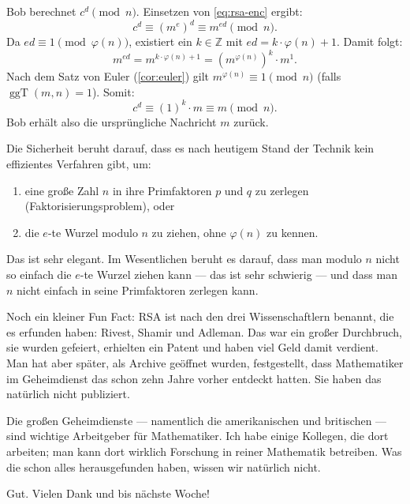\begin{math-stroke}
\begin{short-proof}
Bob berechnet $c^d \pmod n$. Einsetzen von \eqref{eq:rsa-enc} ergibt:
\[
c^d \equiv (m^e)^d \equiv m^{ed} \pmod n.
\]
Da $ed \equiv 1 \pmod{\varphi(n)}$, existiert ein $k \in \mathbb{Z}$ mit $ed = k \cdot \varphi(n) + 1$. Damit folgt:
\[
m^{ed} = m^{k \cdot \varphi(n) + 1} = (m^{\varphi(n)})^k \cdot m^1.
\]
Nach dem Satz von Euler (\cref{cor:euler}) gilt $m^{\varphi(n)} \equiv 1 \pmod n$ (falls $\operatorname{ggT}(m, n) = 1$). Somit:
\[
c^d \equiv (1)^k \cdot m \equiv m \pmod n.
\]
Bob erhält also die ursprüngliche Nachricht $m$ zurück.
\end{short-proof}

\begin{explanation-of-steps}
Die Sicherheit beruht darauf, dass es nach heutigem Stand der Technik kein effizientes Verfahren gibt, um:
\begin{enumerate}
    \item eine große Zahl $n$ in ihre Primfaktoren $p$ und $q$ zu zerlegen (Faktorisierungsproblem), oder
    \item die $e$-te Wurzel modulo $n$ zu ziehen, ohne $\varphi(n)$ zu kennen.
\end{enumerate}
\end{explanation-of-steps}
\end{math-stroke}

\begin{spoken-clean}[01:28:02 - 01:30:21]
Das ist sehr elegant. Im Wesentlichen beruht es darauf, dass man modulo $n$ nicht so einfach die $e$-te Wurzel ziehen kann --- das ist sehr schwierig --- und dass man $n$ nicht einfach in seine Primfaktoren zerlegen kann.

Noch ein kleiner Fun Fact: RSA ist nach den drei Wissenschaftlern benannt, die es erfunden haben: Rivest, Shamir und Adleman. Das war ein großer Durchbruch, sie wurden gefeiert, erhielten ein Patent und haben viel Geld damit verdient. Man hat aber später, als Archive geöffnet wurden, festgestellt, dass Mathematiker im Geheimdienst das schon zehn Jahre vorher entdeckt hatten. Sie haben das natürlich nicht publiziert.

Die großen Geheimdienste --- namentlich die amerikanischen und britischen --- sind wichtige Arbeitgeber für Mathematiker. Ich habe einige Kollegen, die dort arbeiten; man kann dort wirklich Forschung in reiner Mathematik betreiben. Was die schon alles herausgefunden haben, wissen wir natürlich nicht.

Gut. Vielen Dank und bis nächste Woche!
\end{spoken-clean}

